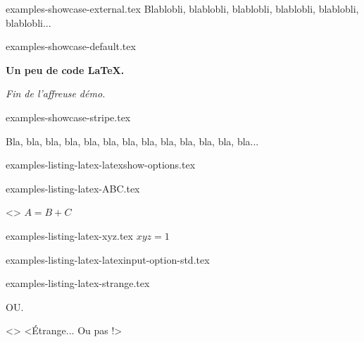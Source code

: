 \begin{filecontents*}[overwrite]{examples-showcase-external.tex}
Blablobli, blablobli, blablobli, blablobli, blablobli, blablobli...
\end{filecontents*}


\begin{filecontents*}[overwrite]{examples-showcase-default.tex}
\begin{tdocshowcase}
    \bfseries Un peu de code \LaTeX.

    \bigskip

    \emph{\large Fin de l'affreuse démo.}
\end{tdocshowcase}
\end{filecontents*}


\begin{filecontents*}[overwrite]{examples-showcase-stripe.tex}
\begin{tdocshowcase}[style = stripe]
    Bla, bla, bla, bla, bla, bla, bla, bla, bla, bla, bla, bla, bla...
\end{tdocshowcase}
\end{filecontents*}


\begin{filecontents*}[overwrite]{examples-listing-latex-latexshow-options.tex}
\end{filecontents*}


\begin{filecontents*}[overwrite]{examples-listing-latex-ABC.tex}
\begin{tdoclatex}<>
$A = B + C$
\end{tdoclatex}
\end{filecontents*}


\begin{filecontents*}[overwrite]{examples-listing-latex-xyz.tex}
$x y z = 1$
\end{filecontents*}


\begin{filecontents*}[overwrite]{examples-listing-latex-latexinput-option-std.tex}
\end{filecontents*}


\begin{filecontents*}[overwrite]{examples-listing-latex-strange.tex}
\begin{tdoclatex}
\end{tdoclatex}
OU.
\begin{tdoclatex}<>
<Étrange... Ou pas !>
\end{tdoclatex}
\end{filecontents*}



